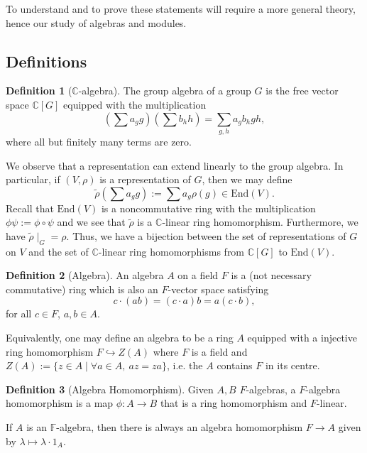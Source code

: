 \documentclass[]{article}
\theoremstyle{definition}
\theoremstyle{definition}
\newtheorem{definition}{Definition}[section]
\begin{document}
To understand and to prove these statements will require a more general theory, 
hence our study of algebras and modules.

\subsection{Definitions}

\begin{definition}[\(\mathbb{C}\)-algebra]
  The group algebra of a group \(G\) is the free vector space \(\mathbb{C}[G]\) 
  equipped with the multiplication 
  \[\left(\sum a_g g\right) \left(\sum b_h h\right) = \sum_{g, h} a_g b_h gh,\]
  where all but finitely many terms are zero.
\end{definition}

We observe that a representation can extend linearly to the group algebra. 
In particular, if \((V, \rho)\) is a representation of \(G\), then we may define
\[\tilde \rho\left(\sum a_g g\right) := \sum a_g \rho(g) \in \text{End}(V).\]
Recall that \(\text{End}(V)\) is a noncommutative ring with the multiplication 
\(\phi \psi := \phi \circ \psi\) and we see that \(\tilde \rho\) is a 
\(\mathbb{C}\)-linear ring homomorphism. Furthermore, we have 
\(\tilde \rho \mid_G = \rho\). Thus, we have a bijection between the set of 
representations of \(G\) on \(V\) and the set of \(\mathbb{C}\)-linear ring 
homomorphisms from \(\mathbb{C}[G]\) to \(\text{End}(V)\).

\begin{definition}[Algebra]
  An algebra \(A\) on a field \(F\) is a (not necessary commutative) ring which 
  is also an \(F\)-vector space satisfying 
  \[c \cdot (ab) = (c \cdot a)b = a(c \cdot b),\]
  for all \(c \in F\), \(a, b \in A\).
\end{definition}

Equivalently, one may define an algebra to be a ring \(A\) equipped with a 
injective ring homomorphism \(F \hookrightarrow Z(A)\) where \(F\) is a field and 
\(Z(A) := \{z \in A \mid \forall a \in A, \ az = za\}\), i.e. 
the \(A\) contains \(F\) in its centre. 

\begin{definition}[Algebra Homomorphism]
  Given \(A, B\) \(F\)-algebras, a \(F\)-algebra homomorphism is a map 
  \(\phi : A \to B\) that is a ring homomorphism and \(F\)-linear.
\end{definition}

If \(A\) is an \(\mathbb{F}\)-algebra, then there is always an algebra 
homomorphism \(F \to A\) given by \(\lambda \mapsto \lambda \cdot 1_A\).
\end{document}
